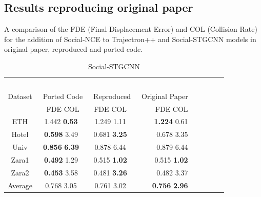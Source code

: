 \subsection{Results reproducing original paper}
A comparison of the FDE (Final Displacement Error) and COL (Collision Rate) for the addition of Social-NCE to Trajectron++ and Social-STGCNN models in original paper, reproduced and ported code.

\begin{table}[H]
\caption{Social-STGCNN} %
\centering %
\begin{tabular}{ccc rrrrr} 
\hline 
&\ \ \ \ \ \\
Dataset&\ Ported Code&\ Reproduced&\ Original Paper&\ \\ [0.5ex]
&\ FDE \hspace{0.25cm} COL&   FDE \hspace{0.25cm} COL& FDE \hspace{0.25cm} COL\\ 
\hline 
ETH &    1.442 \hspace{0.25cm} {\bf{0.53}} & 1.249 \hspace{0.25cm} 1.11 & {\bf{1.224}} \hspace{0.25cm} 0.61\\
Hotel&   {\bf{0.598}} \hspace{0.25cm} 3.49 & 0.681 \hspace{0.25cm} \bf{3.25} & 0.678 \hspace{0.25cm} 3.35\\
Univ &   {\bf{0.856}} \hspace{0.25cm} {\bf{6.39}} & 0.878 \hspace{0.25cm} 6.44 & 0.879 \hspace{0.25cm} 6.44\\
Zara1&   {\bf{0.492}} \hspace{0.25cm} 1.29 & 0.515 \hspace{0.25cm} {\bf{1.02}} & 0.515 \hspace{0.25cm} \bf{1.02}\\  
Zara2&   {\bf{0.453}} \hspace{0.25cm} 3.58 & 0.481 \hspace{0.25cm} {\bf{3.26}} & 0.482 \hspace{0.25cm} 3.37\\
\hline
Average& 0.768 \hspace{0.25cm} 3.05 & 0.761 \hspace{0.25cm} 3.02 & {\bf{0.756}} \hspace{0.25cm} {\bf{2.96}}\\

\hline %
\end{tabular}
\label{tab:hresult}
\end{table}

